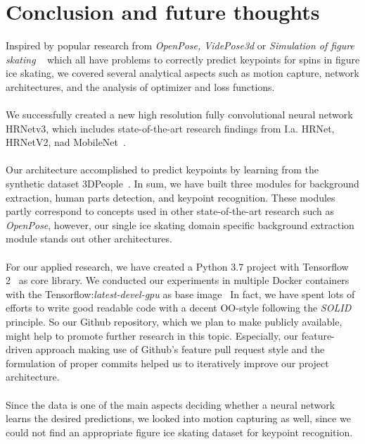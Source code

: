 \chapter{Conclusion and future thoughts}
\label{conclusion}
Inspired by popular research from \textit{OpenPose, VidePose3d} or \textit{Simulation of figure skating} ~\cite{openpose, videopose3d, figureskatingsimulation}
which all have problems to correctly predict keypoints for spins in figure ice skating, we covered several
analytical aspects such as motion capture, network architectures, and the analysis of optimizer and loss functions.
\\\mbox{}\\
We successfully created a new high resolution fully convolutional neural network HRNetv3, which includes state-of-the-art
research findings from I.a. HRNet, HRNetV2, nad MobileNet~\cite{HRNetv1, HRNetv2, mobilenet}.
\\\mbox{}\\
Our architecture accomplished to predict keypoints by learning from the synthetic dataset 3DPeople~\cite{3dpeople}.
In sum, we have built three modules for background extraction, human parts detection, and keypoint recognition.
These modules partly correspond to concepts used in other state-of-the-art research such as \textit{OpenPose}, however, our
single ice skating domain specific background extraction module stands out other architectures.
\\\mbox{}\\
For our applied research, we have created a Python 3.7 project with Tensorflow 2~\cite{tensorflow2} as core library.
We conducted our experiments in multiple Docker containers with the Tensorflow:\textit{latest-devel-gpu} as base
image~\cite{tensorflowdocker}
In fact, we have spent lots of efforts to write good readable code with a decent OO-style following the \textit{SOLID} principle.
So our Github repository, which we plan to make publicly available, might help to promote further research in this topic.
Especially, our feature-driven approach making use of Github's feature pull request style and the formulation of proper
commits helped us to iteratively improve our project architecture.
\\\mbox{}\\
Since the data is one of the main aspects deciding whether a neural network learns the desired predictions, we looked into
motion capturing as well, since we could not find an appropriate figure ice skating dataset for keypoint recognition.
